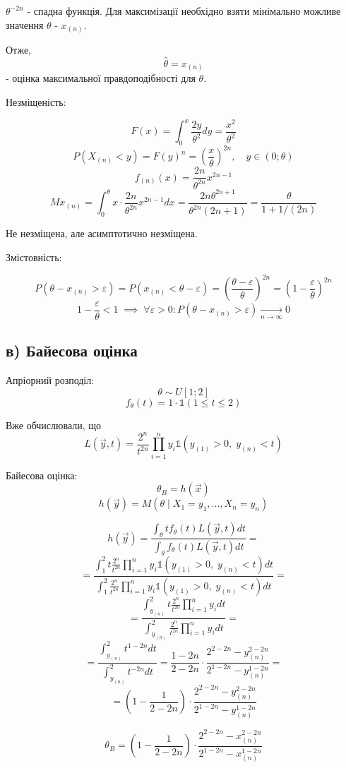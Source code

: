 \documentclass[11pt, a4paper]{article} %
\begin{document}
$\theta^{-2n}$ - спадна функція. Для максимізації необхідно взяти мінімально можливе значення $\theta$ - $x_{(n)}$.

Отже, $$\hat\theta = x_{(n)}$$ - оцінка максимальної правдоподібності для $\theta$.

Незміщеність:

$$F(x) = \int_0^x \frac{2y}{\theta^2} dy = \frac{x^2}{\theta^2}$$
$$P(X_{(n)} < y) = F(y)^n = \left(\frac{x}{\theta}\right)^{2n}, \quad y\in(0;\theta)$$
$$f_{(n)}(x) = \frac{2n}{\theta^{2n}} x^{2n-1} $$
$$Mx_{(n)} = \int_0^\theta x\cdot \frac{2n}{\theta^{2n}} x^{2n-1} dx = \frac{2n\theta^{2n+1}}{\theta^{2n}(2n+1)} = \frac{\theta}{1+1/(2n)}$$

Не незміщена, але асимптотично незміщена.

Змістовність:

$$P(\theta - x_{(n)} > \varepsilon) = P(x_{(n)} < \theta - \varepsilon) = \left(\frac{\theta - \varepsilon}{\theta}\right)^{2n} = \left(1-\frac{\varepsilon}{\theta}\right)^{2n}$$
$$1-\frac{\varepsilon}{\theta}<1 \; \implies \; \forall \varepsilon>0: P(\theta - x_{(n)} > \varepsilon) \underset{n \to \infty}{\longrightarrow} 0$$

\subsection*{в) Байесова оцінка}

Апріорний розподіл:
$$\theta \sim U[1;2]$$
$$f_\theta(t) = 1 \cdot \mathbb{1}(1 \le t \le 2)$$

Вже обчислювали, що 
$$L(\vec y, t) = \frac{2^n}{t^{2n}} \prod_{i=1}^n y_i \mathbb{1}(y_{(1)} > 0,\; y_{(n)}<t)$$

Байесова оцінка:
$$\theta_B = h(\vec x)$$
$$h(\vec y) = M(\theta \;|\; X_1=y_1, ..., X_n=y_n)$$

$$h(\vec y) = \frac{\int_\theta t f_\theta(t) L(\vec y, t) dt}{\int_\theta f_\theta(t) L(\vec y, t) dt} = $$
$$= \frac{\int_1^2 t \frac{2^n}{t^{2n}} \prod_{i=1}^n y_i \mathbb{1}(y_{(1)} > 0,\; y_{(n)}<t) dt}{\int_1^2 \frac{2^n}{t^{2n}} \prod_{i=1}^n y_i \mathbb{1}(y_{(1)} > 0,\; y_{(n)}<t) dt} = $$
$$= \frac{\int_{y_{(n)}}^2 t \frac{2^n}{t^{2n}} \prod_{i=1}^n y_i dt}{\int_{y_{(n)}}^2 \frac{2^n}{t^{2n}} \prod_{i=1}^n y_i dt} = $$
$$= \frac{\int_{y_{(n)}}^2 t^{1-2n} dt}{\int_{y_{(n)}}^2 t^{-2n} dt} = \frac{1-2n}{2-2n} \cdot \frac{2^{2-2n} - y_{(n)}^{2-2n}}{2^{1-2n} - y_{(n)}^{1-2n}} = $$
$$= \left(1-\frac{1}{2-2n}\right) \cdot \frac{2^{2-2n} - y_{(n)}^{2-2n}}{2^{1-2n} - y_{(n)}^{1-2n}}$$

$$\theta_B = \left(1-\frac{1}{2-2n}\right) \cdot \frac{2^{2-2n} - x_{(n)}^{2-2n}}{2^{1-2n} - x_{(n)}^{1-2n}}$$
\end{document}
